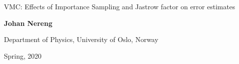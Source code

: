 \documentclass[%
oneside,                 %
final,                   %
10pt]{article}
\begin{document}

\newcommand{\exercisesection}[1]{\subsection*{#1}}






\thispagestyle{empty}

\begin{center}
{\LARGE\bf
\begin{spacing}{1.25}
VMC: Effects of Importance Sampling and Jastrow factor on error estimates %
\end{spacing}
}
\end{center}


\begin{center}
{\bf Johan Nereng}
\end{center}

    \begin{center}
\centerline{{\small Department of Physics, University of Oslo, Norway}}
\end{center}
    

\begin{center}
Spring, 2020
\end{center}
\end{document}
